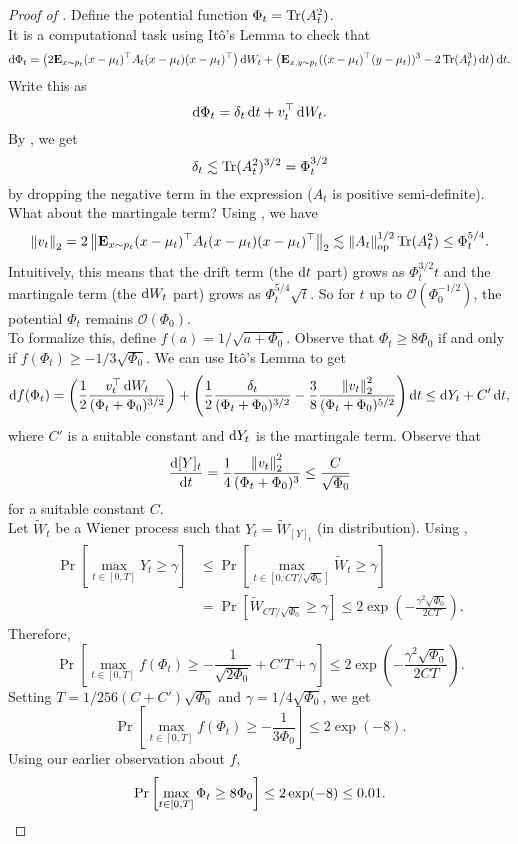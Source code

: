 		\begin{proof}[Proof of ]
			Define the potential function $\Phi_t = \operatorname{Tr}(A_t^2)$.\\
			It is a computational task using It\^{o}'s Lemma to check that
			\[ \operatorname{d}\!{\Phi_t} = \left( 2 \textbf{E}_{x \sim p_t} (x-\mu_t)^\top A_t (x-\mu_t)(x-\mu_t)^\top \right) \operatorname{d}\!{W}_t + \left( \textbf{E}_{x,y \sim p_t} ((x-\mu_t)^\top(y-\mu_t))^3 - 2 \operatorname{Tr}(A_t^3)\operatorname{d}\!{t} \right) \operatorname{d}\!{t}. \]
			Write this as
			\[ \operatorname{d}\!{\Phi_t} = \delta_t \operatorname{d}\!{t} + v_t^\top \operatorname{d}\!{W}_t. \]
			By , we get
			\[ \delta_t \lesssim \operatorname{Tr}(A_t^2)^{3/2} = \Phi_t^{3/2} \]
			by dropping the negative term in the expression ($A_t$ is positive semi-definite). What about the martingale term? Using , we have
			\[ \left\lVert v_t\right\rVert_2 = 2 \left\lVert\textbf{E}_{x \sim p_t} (x-\mu_t)^\top A_t (x-\mu_t)(x-\mu_t)^\top\right\rVert_2 \lesssim \left\lVert A_t\right\rVert_{\text{op}}^{1/2} \operatorname{Tr}(A_t^2) \leq \Phi_t^{5/4}. \]
			Intuitively, this means that the drift term (the $\operatorname{d}\!{t}$ part) grows as $\Phi_t^{3/2}t$ and the martingale term (the $\operatorname{d}\!{W}_t$ part) grows as $\Phi_t^{5/4}\sqrt{t}$. So for $t$ up to $\mathcal{O}(\Phi_0^{-1/2})$, the potential $\Phi_t$ remains $\mathcal{O}(\Phi_0)$.\\
			To formalize this, define $f(a) = 1/\sqrt{a + \Phi_0}$. Observe that $\Phi_t \geq 8 \Phi_0$ if and only if $f(\Phi_t) \geq -1/3\sqrt{\Phi_0}$. We can use It\^{o}'s Lemma to get
			\[ \operatorname{d}\!{f(\Phi_t)} = \left(\frac{1}{2} \frac{v_t^\top \operatorname{d}\!{W}_t}{(\Phi_t + \Phi_0)^{3/2}} \right) + \left(\frac{1}{2}\frac{\delta_t}{(\Phi_t+\Phi_0)^{3/2}} - \frac{3}{8}\frac{\left\lVert v_t\right\rVert_2^2}{(\Phi_t + \Phi_0)^{5/2}}\right)\operatorname{d}\!{t} \leq \operatorname{d}\!{Y_t} + C' \operatorname{d}\!{t}, \]
			where $C'$ is a suitable constant and $\operatorname{d}\!{Y_t}$ is the martingale term. Observe that
			\[ \frac{\operatorname{d}\!{[Y]_t}}{\operatorname{d}\!{t}} = \frac{1}{4} \frac{\left\lVert v_t\right\rVert_2^2}{(\Phi_t + \Phi_0)^3} \leq \frac{C}{\sqrt{\Phi_0}} \]
			for a suitable constant $C$.\\
			Let $\tilde{W}_t$ be a Wiener process such that $Y_t = \tilde{W}_{[Y]_t}$ (in distribution). Using ,
			\begin{align*}
				\Pr\left[\max_{t\in[0,T]} Y_t \geq \gamma\right] &\leq \Pr\left[\max_{t\in\left[0,CT/\sqrt{\Phi_0}\right]} \tilde{W}_t \geq \gamma \right] \\
					&= \Pr\left[\tilde{W}_{CT/\sqrt{\Phi_0}} \geq \gamma\right] \leq 2 \exp\left(-\frac{\gamma^2\sqrt{\Phi_0}}{2CT}\right).
			\end{align*}
			Therefore,
			\[ \Pr\left[\max_{t\in[0,T]}f(\Phi_t) \geq -\frac{1}{\sqrt{2\Phi_0}} + C'T + \gamma\right] \leq 2\exp\left(-\frac{\gamma^2\sqrt{\Phi_0}}{2CT}\right). \]
			Setting $T = 1/256(C+C')\sqrt{\Phi_0}$ and $\gamma = 1/4\sqrt{\Phi_0}$, we get
			\[ \Pr\left[\max_{t\in[0,T]} f(\Phi_t) \geq -\frac{1}{3\Phi_0}\right] \leq 2\exp(-8). \]
			Using our earlier observation about $f$,
			\[ \Pr\left[\max_{t\in[0,T]} \Phi_t \geq 8\Phi_0 \right] \leq 2\exp(-8) \leq 0.01. \qedhere \]
		\end{proof}


